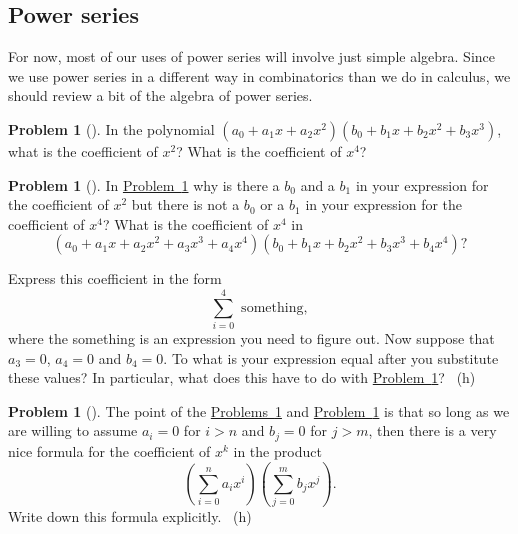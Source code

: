 \documentclass[10pt,]{book}
\theoremstyle{plain}
\theoremstyle{definition}
\newtheorem{activity}[project]{Problem}
\theoremstyle{definition}
\numberwithin{equation}{chapter}
\begin{document}
\subsection[{Power series}]{Power series}\label{subsection-43}
\hypertarget{p-1075}{}%
For now, most of our uses of power series will involve just simple algebra. Since we use power series in a different way in combinatorics than we do in calculus, we should review a bit of the algebra of power series.%
\begin{activity}[] \label{coeffinproduct}
\hypertarget{p-1076}{}%
In the polynomial \((a_0 +a_1x+a_2x^2)(b_0+b_1x+b_2x^2+b_3x^3)\), what is the coefficient of \(x^2\)? What is the coefficient of \(x^4\)?%
\end{activity}
\begin{activity}[] \label{coeffinproduct1}
\hypertarget{p-1078}{}%
In \hyperref[coeffinproduct]{Problem~\ref{coeffinproduct}} why is there a \(b_0\) and a \(b_1\) in your expression for the coefficient of \(x^2\) but there is not a \(b_0\) or a \(b_1\) in your expression for the coefficient of \(x^4\)? What is the coefficient of \(x^4\) in%
\begin{equation*}
(a_0+a_1x+a_2x^2+a_3x^3+a_4x^4)(b_0+b_1x+b_2x^2
+b_3x^3+b_4x^4)?
\end{equation*}
%
\par
\hypertarget{p-1079}{}%
Express this coefficient in the form%
\begin{equation*}
\sum_{i=0}^4 \mbox{ something} ,
\end{equation*}
where the something is an expression you need to figure out. Now suppose that \(a_3=0\), \(a_4=0\) and \(b_4=0\). To what is your expression equal after you substitute these values? In particular, what does this have to do with \hyperref[coeffinproduct]{Problem~\ref{coeffinproduct}}?%
~{\tiny (h)}\end{activity}
\begin{activity}[] \label{coeffinproduct2}
\hypertarget{p-1083}{}%
The point of the \hyperref[coeffinproduct]{Problems~\ref{coeffinproduct}} and \hyperref[coeffinproduct1]{Problem~\ref{coeffinproduct1}} is that so long as we are willing to assume \(a_i=0\) for \(i>n\) and \(b_j =0\) for \(j>m\), then there is a very nice formula for the coefficient of \(x^k\) in the product%
\begin{equation*}
\left(\sum_{i=0}^n a_ix^i\right)\left(\sum_{j=0}^m b_jx^j\right).
\end{equation*}
Write down this formula explicitly.%
~{\tiny (h)}\end{activity}
\end{document}
